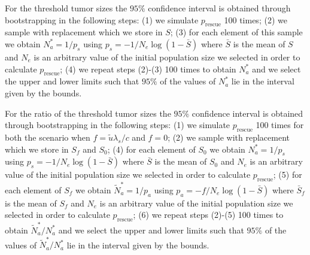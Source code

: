 \documentclass[12pt]{extarticle}
\newcommand{\presc}{p_\text{rescue}}
\begin{document}
\begin{appendices}
For the threshold tumor sizes the $95\%$ confidence interval is obtained through bootstrapping in the following steps: (1) we simulate $\presc$ 100 times; (2) we sample with replacement which we store in $S$; (3) for each element of this sample we obtain $N_a^*=1/p_s$ using $p_s=-1/N_e\log\left(1-\bar{S}\right)$ where $\bar{S}$ is the mean of $S$ and $N_e$ is an arbitrary value of the initial population size we selected in order to calculate $\presc$; (4) we repeat steps (2)-(3) 100 times to obtain $N_a^*$ and we select the upper and lower limits such that $95\%$ of the values of $N_a^*$ lie in the interval given by the bounds.

For the ratio of the threshold tumor sizes the $95\%$ confidence interval is obtained through bootstrapping in the following steps: (1) we simulate $\presc$ 100 times for both the scenario when $f=\tilde{u}\lambda_s/c$ and $f=0$; (2) we sample with replacement which we store in $S_f$ and  $S_0$; (4) for each element of $S_0$ we obtain $N_a^*=1/p_s$ using $p_s=-1/N_e\log\left(1-\bar{S}\right)$ where $\bar{S}$ is the mean of $S_0$ and $N_e$ is an arbitrary value of the initial population size we selected in order to calculate $\presc$; (5) for each element of $S_f$ we obtain $\tilde{N}_a^*=1/p_a$ using $p_a=-f/N_e\log\left(1-\bar{S}\right)$ where $\bar{S}_f$ is the mean of $S_f$ and $N_e$ is an arbitrary value of the initial population size we selected in order to calculate $\presc$; (6) we repeat steps (2)-(5) 100 times to obtain $\tilde{N}_a^*/N_a^*$ and we select the upper and lower limits such that $95\%$ of the values of $\tilde{N}_a^*/N_a^*$ lie in the interval given by the bounds.

\end{appendices}
\end{document}
